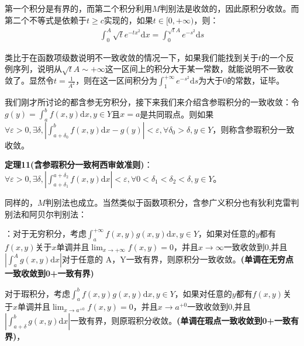 \documentclass{ctexart}
\let\oldtextbf\textbf
\renewcommand{\textbf}[1]{\textcolor{brown!50!red}{\oldtextbf{#1}}}
\begin{document}
第一个积分是有界的，而第二个积分利用$M$判别法是收敛的，因此原积分收敛。而第二个不等式是依赖于$t\geq c$实现的，如果$t\in[0,+\infty)$，则：
\begin{align*}
\int_0^{A}\sqrt{t}e^{-tx^2}\mathrm{d}x=\int_0^{\sqrt{t}A }e^{-s^2}\mathrm{d}s
\end{align*}

类比于在函数项级数说明不一致收敛的情况一下，如果我们能找到关于$t$的一个反例序列，说明从$\sqrt{t}A\sim+\infty$这一区间上的积分大于某一常数，就能说明不一致收敛了。显然令$t=\frac{1}{A^2}$，则在这一区间积分为$\int_1^{+\infty}e^{-s^2}\mathrm{d}s$为大于0的常数，证毕。

我们刚才所讨论的都含参无穷积分，接下来我们来介绍含参瑕积分的一致收敛：令$g(y)=\int_a^b f(x,y)\mathrm{d}x,y\in Y$且$x=a$是共同瑕点。则如果$\forall \varepsilon>0,\exists \delta ,|\int_{a+\delta_0}^b f(x,y)\mathrm{d}x-g(y)|<\varepsilon,\forall \delta_0>\delta,y\in Y$，则称含参瑕积分一致收敛。
\begin{tcolorbox}[
    colback=bac2,     %
    colframe=fra2,   %
    coltitle=white,             %
    coltext=tex2,
    title=含参瑕积分一致柯西审敛准则,
    fonttitle=\bfseries,        %
arc=3mm,                     %
breakable
]
\textbf{\color{brown!50!red}定理11(含参瑕积分一致柯西审敛准则)}：$\forall \varepsilon>0,\exists \delta,|\int_{a+\delta_1}^{a+\delta_2} f(x,y)\mathrm{d}x|<\varepsilon,\forall 0<\delta_1< \delta_2< \delta ,y\in Y$。
\end{tcolorbox}

同样的，$M$判别法也成立。当然类似于函数项积分，含参广义积分也有狄利克雷判别法和阿贝尔判别法：
\begin{tcolorbox}[
    colback=bac2,     %
    colframe=fra2,   %
    coltitle=white,             %
    coltext=tex2,
    title=含参广义积分一致狄利克雷判别法,
    fonttitle=\bfseries,        %
arc=3mm,                     %
breakable
]

\textbf{\color{brown!50!red}{定理12（含参广义积分一致狄利克雷）}}：对于无穷积分，考虑$\int_a^{+\infty}f(x,y)g(x,y)\mathrm{d}x,y\in Y$，如果对任意的$y$都有$f(x,y)$关于$x$单调并且$\lim_{x\to+\infty}f(x,y)=0$，并且$x\to\infty$一致收敛到0,并且$|\int_a^A g(x,y)\mathrm{d}x|$对于任意的
A，Y一致有界，则原积分一致收敛。\textbf{\color{brown!50!red}(单调在无穷点一致收敛到0+一致有界)}

对于瑕积分，考虑$\int_a^b f(x,y)g(x,y)\mathrm{d}x,y\in Y$，如果对任意的$y$都有$f(x,y)$关于$x$单调并且$\lim_{x\to a^{+0}}f(x,y)=0$，并且$x\to a^{+0}$一致收敛到0,并且$|\int_{a+\delta}^b g(x,y)\mathrm{d}x|$一致有界，则原瑕积分收敛。\textbf{\color{brown!50!red}(单调在瑕点一致收敛到0+一致有界)}，
\end{tcolorbox}
\end{document}
